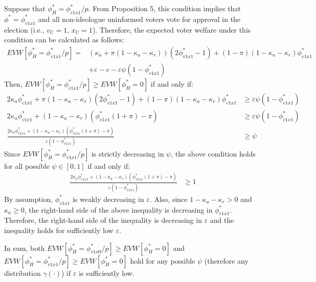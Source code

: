 \par Suppose that $\phi^*_H=\phi^*_{v1x1}/p$. From Proposition 5, this condition implies that $\phi^*=\phi^*_{v1x1}$ and all non-ideologue uninformed voters vote for approval in the election (i.e., $v_U=1$, $x_U=1$). Therefore, the expected voter welfare under this condition can be calculated as follows:
\begin{align*}
EVW[\phi^*_H=\phi^*_{v1x1}/p] =& (\kappa_a + \pi(1-\kappa_a-\kappa_r))(2\phi^*_{v1x1}-1) + (1-\pi)(1-\kappa_a-\kappa_r)\phi^*_{v1x1} \\ &+ \varepsilon - c - \varepsilon \psi (1-\phi^*_{v1x1})
\end{align*}
\noindent Then, $EVW[\phi^*_H=\phi^*_{v1x1}/p] \geq EVW[\phi^*_H=0]$ if and only if:
\begin{align*}
2\kappa_a\phi^*_{v1x1} + \pi(1-\kappa_a-\kappa_r)(2\phi^*_{v1x1}-1) + (1-\pi)(1-\kappa_a-\kappa_r)\phi^*_{v1x1} &\geq \varepsilon \psi (1-\phi^*_{v1x1}) \\
2\kappa_a\phi^*_{v1x1} + (1-\kappa_a-\kappa_r)( \phi^*_{v1x1} (1+\pi) - \pi ) &\geq \varepsilon \psi (1-\phi^*_{v1x1}) \\
\frac{2\kappa_a\phi^*_{v1x1} + (1-\kappa_a-\kappa_r)( \phi^*_{v1x1} (1+\pi) - \pi )}{\varepsilon (1-\phi^*_{v1x1})} &\geq \psi  
\end{align*}
\noindent Since $EVW[\phi^*_H=\phi^*_{v1x1}/p]$ is strictly decreasing in $\psi$, the above condition holds for all possible $\psi \in [0,1]$ if and only if:
\begin{align*}
\frac{2\kappa_a\phi^*_{v1x1} + (1-\kappa_a-\kappa_r)( \phi^*_{v1x1} (1+\pi) - \pi )}{\varepsilon (1-\phi^*_{v1x1})} &\geq 1   
\end{align*}
\noindent By assumption, $\phi^*_{v1x1}$ is weakly decreasing in $\varepsilon$. Also, since $1-\kappa_a-\kappa_r>0$ and $\kappa_a\geq0$, the right-hand side of the above inequality is decreasing in $\phi^*_{v1x1}$. Therefore, the right-hand side of the inequality is decreasing in $\varepsilon$ and the inequality holds for sufficiently low $\varepsilon$.

\par In sum, both $EVW[\phi^*_H=\phi^*_{v1x0}/p] \geq EVW[\phi^*_H=0]$ and $EVW[\phi^*_H=\phi^*_{v1x1}/p] \geq EVW[\phi^*_H=0]$ hold for any possible $\psi$ (therefore any distribution $\gamma(\cdot)$) if $\varepsilon$ is sufficiently low.

